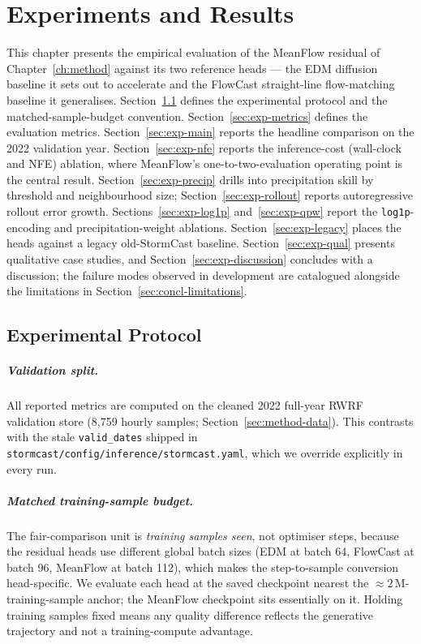
\chapter{Experiments and Results}
\label{ch:experiments}

This chapter presents the empirical evaluation of the MeanFlow residual of Chapter~\ref{ch:method} against its two reference heads --- the EDM diffusion baseline it sets out to accelerate and the FlowCast straight-line flow-matching baseline it generalises. Section~\ref{sec:exp-protocol} defines the experimental protocol and the matched-sample-budget convention. Section~\ref{sec:exp-metrics} defines the evaluation metrics. Section~\ref{sec:exp-main} reports the headline comparison on the 2022 validation year. Section~\ref{sec:exp-nfe} reports the inference-cost (wall-clock and NFE) ablation, where MeanFlow's one-to-two-evaluation operating point is the central result. Section~\ref{sec:exp-precip} drills into precipitation skill by threshold and neighbourhood size; Section~\ref{sec:exp-rollout} reports autoregressive rollout error growth. Sections~\ref{sec:exp-log1p} and~\ref{sec:exp-qpw} report the \texttt{log1p}-encoding and precipitation-weight ablations. Section~\ref{sec:exp-legacy} places the heads against a legacy old-StormCast baseline. Section~\ref{sec:exp-qual} presents qualitative case studies, and Section~\ref{sec:exp-discussion} concludes with a discussion; the failure modes observed in development are catalogued alongside the limitations in Section~\ref{sec:concl-limitations}.

\section{Experimental Protocol}
\label{sec:exp-protocol}

\paragraph{Validation split.} All reported metrics are computed on the cleaned 2022 full-year RWRF validation store (8{,}759 hourly samples; Section~\ref{sec:method-data}). This contrasts with the stale \texttt{valid\_dates} shipped in \texttt{stormcast/config/inference/stormcast.yaml}, which we override explicitly in every run.

\paragraph{Matched training-sample budget.} The fair-comparison unit is \emph{training samples seen}, not optimiser steps, because the residual heads use different global batch sizes (EDM at batch 64, FlowCast at batch 96, MeanFlow at batch 112), which makes the step-to-sample conversion head-specific. We evaluate each head at the saved checkpoint nearest the $\approx 2\,\text{M}$-training-sample anchor; the MeanFlow checkpoint sits essentially on it. Holding training samples fixed means any quality difference reflects the generative trajectory and not a training-compute advantage.

